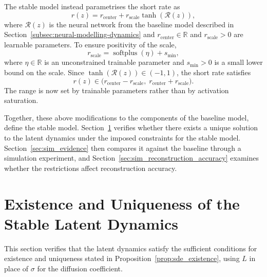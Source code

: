 \begin{description}[
    style=unboxed,
    leftmargin=0pt,
    labelindent=0pt,
    labelsep=0.5em
]
The stable model instead parametrises the short rate as
\[
r(z)
=
r_{\mathrm{center}}
+
r_{\mathrm{scale}}\tanh(\mathcal{R}(z)),
\]
where \(\mathcal{R}(z)\) is the neural network from the baseline model described in Section~\ref{subsec:neural-modelling-dynamics} and \(r_{\mathrm{center}}\in\mathbb{R}\) and \(r_{\mathrm{scale}}>0\) are learnable parameters. To ensure positivity of the scale,
\[
r_{\mathrm{scale}}
=
\operatorname{softplus}(\eta)+s_{\min},
\]
where \(\eta\in\mathbb{R}\) is an unconstrained trainable parameter and \(s_{\min}>0\) is a small lower bound on the scale. Since \(\tanh(\mathcal{R}(z))\in(-1,1)\), the short rate satisfies
\[
r(z)
\in
\bigl(
r_{\mathrm{center}}-r_{\mathrm{scale}},
\;
r_{\mathrm{center}}+r_{\mathrm{scale}}
\bigr).
\]
The range is now set by trainable parameters rather than by activation saturation. 
\end{description}


Together, these above modifications to the components of the baseline model, define the stable model. Section~\ref{sec:verify_stable_dynamics} verifies whether there exists a unique solution to the latent dynamics under the imposed constraints for the stable model. Section~\ref{sec:sim_evidence} then compares it against the baseline through a simulation experiment, and Section~\ref{sec:sim_reconstruction_accuracy} examines whether the restrictions affect reconstruction accuracy.

\section{Existence and Uniqueness of the Stable Latent Dynamics}
\label{sec:verify_stable_dynamics}
This section verifies that the latent dynamics satisfy the sufficient conditions for existence and uniqueness stated in Proposition~\ref{prop:sde_existence}, using $L$ in place of $\sigma$ for the diffusion coefficient.


